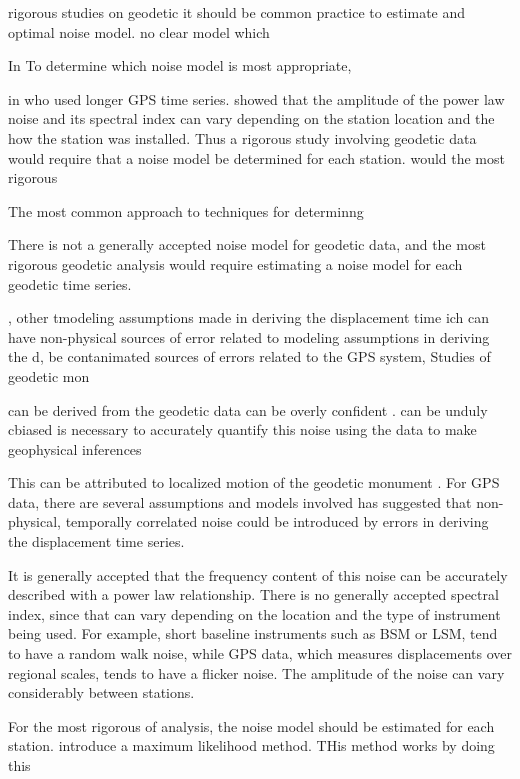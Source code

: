 \documentclass[10pt,a4paper]{article}
\begin{document}
  rigorous studies on geodetic  it should be common practice to estimate and optimal noise model.  no clear model which 

In To determine which noise model is most appropriate,     

in  who used longer GPS time series.  \citet{Langbein2008} showed that the amplitude of the power law noise and its spectral index can vary depending on the station location and the how the station was installed. Thus a rigorous study involving geodetic data would require that a noise model be determined for each station.  would    the most rigorous      

The most common approach to techniques for determinng  


There is not a generally accepted noise model for geodetic data, and the most rigorous geodetic analysis would require estimating a noise model for each geodetic time series.  

    ,  other tmodeling assumptions made in deriving the displacement time ich can have non-physical sources of error related to modeling assumptions in deriving the d,  be contanimated sources of errors  related to the GPS system,            Studies of geodetic mon  


can be derived from the geodetic data can be overly confident \citep[e.g][]{Mao1999}.  can be unduly cbiased  is necessary to accurately quantify this noise using the data to make geophysical inferences 


This can be attributed to localized motion of the geodetic monument \citep[e.g.][]{Wyatt1982,Wyatt1989,Agnew1992,King2009}. For GPS data, there are several assumptions and models involved  \citet{Langbeing2008,Langbein2012} has suggested that non-physical, temporally correlated noise could be introduced by errors in deriving the displacement time series.  

It is generally accepted that the frequency content of this noise can be accurately described with a power law relationship.  There is no generally accepted spectral index, since that can vary depending on the location and the type of instrument being used.  For example, short baseline instruments such as BSM or LSM, tend to have a random walk noise, while GPS data, which measures displacements over regional scales, tends to have a flicker noise.  The amplitude of the noise can vary considerably between stations. 

For the most rigorous of analysis, the noise model should be estimated for each station.  \citet{Langbein1997} introduce a maximum likelihood method. THis method works by doing this
\end{document}
